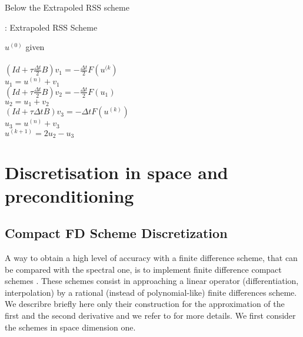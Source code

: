 {Below the Extrapoled RSS scheme

 \begin{center}
\begin{minipage}[H]{12cm}
  \begin{algorithm}[H]
    \caption{: Extrapoled RSS Scheme}\label{ExtraRSS}
    \begin{algorithmic}[1]
        \State $u^{(0)}$ given\\
            \\
              $ (Id+\tau \frac{\Delta t}{2}B) v_1=-\frac{\Delta t}{2} F(u^{(k})$\\
               $u_1=u^{(n)} +v_1$\\
                $ (Id+\tau \frac{\Delta t}{2}B) v_2=-\frac{\Delta t}{2} F(u_1)$\\
                $u_2=u_1+v_2$\\
                $(Id+\tau \Delta tB) v_3=-\Delta t  F(u^{(k)})$\\
                $u_3=u^{(n)}+v_3$\\
                 $u^{(k+1)}=2u_2-u_3$ \\             
            \EndFor
    \end{algorithmic}
    \end{algorithm}
\end{minipage}
\end{center}
\section{Discretisation in space and preconditioning}
\subsection{Compact FD Scheme Discretization}
A way to obtain a high level of accuracy with a finite difference scheme, that can be compared with the spectral one, is to implement finite difference compact schemes \cite{Lele}. These schemes consist in approaching a linear operator (differentiation, interpolation) by a rational (instead of polynomial-like) finite differences scheme. 
We describre briefly here only their construction for the approximation of the first and the second derivative and we refer to \cite{Lele} for more details. We first consider the schemes in space dimension one.

}
